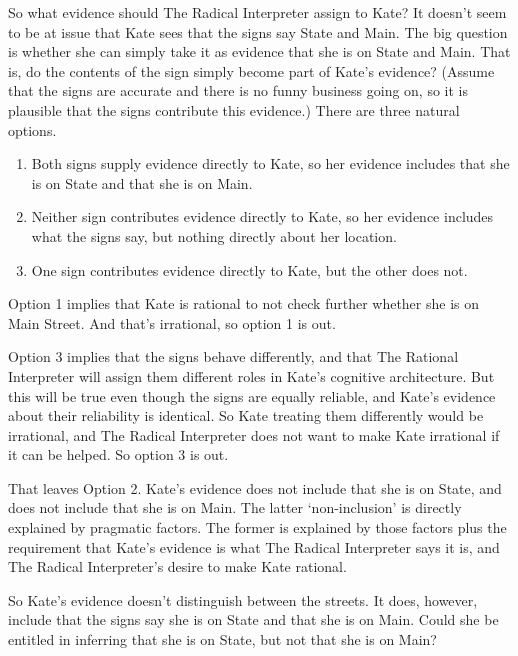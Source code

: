 \documentclass[
  11pt,
]{book}
\providecommand{\tightlist}{%
  \setlength{\itemsep}{0pt}\setlength{\parskip}{0pt}}
\begin{document}
So what evidence should The Radical Interpreter assign to Kate? It doesn't seem to be at issue that Kate sees that the signs say State and Main. The big question is whether she can simply take it as evidence that she is on State and Main. That is, do the contents of the sign simply become part of Kate's evidence? (Assume that the signs are accurate and there is no funny business going on, so it is plausible that the signs contribute this evidence.) There are three natural options.

\begin{enumerate}
\def\labelenumi{\arabic{enumi}.}
\tightlist
\item
  Both signs supply evidence directly to Kate, so her evidence includes that she is on State and that she is on Main.
\item
  Neither sign contributes evidence directly to Kate, so her evidence includes what the signs say, but nothing directly about her location.
\item
  One sign contributes evidence directly to Kate, but the other does not.
\end{enumerate}

Option 1 implies that Kate is rational to not check further whether she is on Main Street. And that's irrational, so option 1 is out.

Option 3 implies that the signs behave differently, and that The Rational Interpreter will assign them different roles in Kate's cognitive architecture. But this will be true even though the signs are equally reliable, and Kate's evidence about their reliability is identical. So Kate treating them differently would be irrational, and The Radical Interpreter does not want to make Kate irrational if it can be helped. So option 3 is out.

That leaves Option 2. Kate's evidence does not include that she is on State, and does not include that she is on Main. The latter `non-inclusion' is directly explained by pragmatic factors. The former is explained by those factors plus the requirement that Kate's evidence is what The Radical Interpreter says it is, and The Radical Interpreter's desire to make Kate rational.

So Kate's evidence doesn't distinguish between the streets. It does, however, include that the signs say she is on State and that she is on Main. Could she be entitled in inferring that she is on State, but not that she is on Main?
\end{document}
